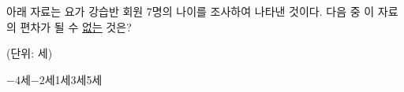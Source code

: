 아래 자료는 요가 강습반 회원 7명의 나이를 조사하여 나타낸 것이다. 다음 중 이 자료의 편차가 될 수 \underline{없는} 것은?\par\noindent\hfill{\footnotesize (단위: 세)}
\begin{choices32}{$-4$세}{$-2$세}{1세}{3세}{5세}\end{choices32}
